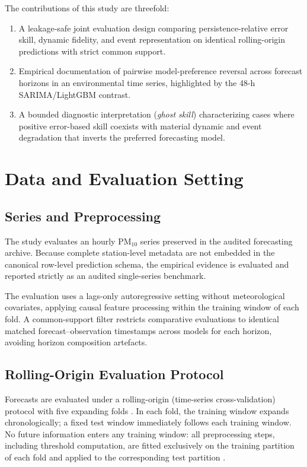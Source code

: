 \documentclass[12pt]{article}
\begin{document}
The contributions of this study are threefold:
\begin{enumerate}
  \item A leakage-safe joint evaluation design comparing persistence-relative error skill, dynamic fidelity, and event representation on identical rolling-origin predictions with strict common support.
  \item Empirical documentation of pairwise model-preference reversal across forecast horizons in an environmental time series, highlighted by the 48-h SARIMA/LightGBM contrast.
  \item A bounded diagnostic interpretation (\emph{ghost skill}) characterizing cases where positive error-based skill coexists with material dynamic and event degradation that inverts the preferred forecasting model.
\end{enumerate}

\section{Data and Evaluation Setting}
\label{sec:methods}

\subsection{Series and Preprocessing}
\label{sec:data}

The study evaluates an hourly $\mathrm{PM}_{10}$ series preserved in the audited forecasting archive. Because complete station-level metadata are not embedded in the canonical row-level prediction schema, the empirical evidence is evaluated and reported strictly as an audited single-series benchmark.

The evaluation uses a lags-only autoregressive setting without meteorological covariates, applying causal feature processing within the training window of each fold. A common-support filter restricts comparative evaluations to identical matched forecast--observation timestamps across models for each horizon, avoiding horizon composition artefacts.

\subsection{Rolling-Origin Evaluation Protocol}
\label{sec:rolling_origin}

Forecasts are evaluated under a rolling-origin (time-series cross-validation) protocol with five expanding folds \citep{tashman2000,bergmeir2018}. In each fold, the training window expands chronologically; a fixed test window immediately follows each training window. No future information enters any training window: all preprocessing steps, including threshold computation, are fitted exclusively on the training partition of each fold and applied to the corresponding test partition \citep{kaufman2012}.
\end{document}

